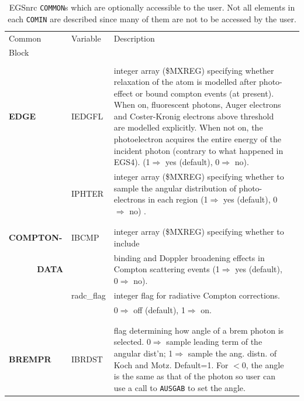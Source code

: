 \clearpage
 \begin{table}[hb]
 
 \begin{center}
 \label{tab_new_commons}
 \caption{EGSnrc {\tt COMMON}s which are optionally accessible to the user. Not all
elements in each {\tt COMIN} are described since many of them are not
to be accessed by the user.\vspace*{5mm} }
 \begin{tabular}{ l  l   p{105mm}l  |}
 \hline
 Common & Variable & Description \\
  Block &&\\
    \hline
&&\\
{\bfseries EDGE}	&IEDGFL	& integer array (\$MXREG) specifying whether
relaxation of the atom is modelled after photo-effect or bound compton
events (at present). When on, fluorescent photons, Auger electrons and
Coster-Kronig electrons above threshold are modelled explicitly. When not
on, the photoelectron acquires the entire energy of the incident photon
(contrary to what happened in EGS4).  (1$\Rightarrow$ yes (default),
0$\Rightarrow$ no).\\
	&IPHTER	& integer  array (\$MXREG) specifying whether to sample the
         angular distribution of photo-electrons in each region
(1$\Rightarrow$ yes (default),
0$\Rightarrow$ no) .\\
&&\\
\hline
&&\\
{\bfseries COMPTON-} &IBCMP &integer array (\$MXREG) specifying whether to
                    include \\
{\bfseries ~~~~~~DATA} & & binding and Doppler broadening effects in Compton
            scattering events (1$\Rightarrow$ yes (default), 0$\Rightarrow$ no).\\
                  & radc\_flag & integer flag for radiative Compton corrections.\\
                 && 0$\Rightarrow$ off (default), 1$\Rightarrow$ on.\\
&&\\
\hline
&&\\
{\bfseries BREMPR} &  IBRDST & flag determining how angle of a brem
photon is selected.  0$\Rightarrow$ sample leading term of the angular
dist'n; 1$\Rightarrow$ sample the ang. distn. of Koch and Motz. Default=1.
For $<$0, the angle is the same as that of the photon so user can use a
call to {\tt AUSGAB} to set the angle.\\


\end{tabular}
\end{center}
\end{table}

